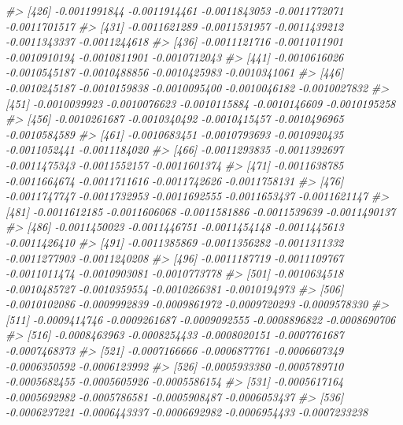\documentclass[
]{article}
\newenvironment{Shaded}{\begin{snugshade}}{\end{snugshade}}
\newcommand{\CommentTok}[1]{\textcolor[rgb]{0.56,0.35,0.01}{\textit{#1}}}
\begin{document}
\begin{Shaded}
\begin{Highlighting}[]
\CommentTok{\#\textgreater{} [426] {-}0.0011991844 {-}0.0011914461 {-}0.0011843053 {-}0.0011772071 {-}0.0011701517}
\CommentTok{\#\textgreater{} [431] {-}0.0011621289 {-}0.0011531957 {-}0.0011439212 {-}0.0011343337 {-}0.0011244618}
\CommentTok{\#\textgreater{} [436] {-}0.0011121716 {-}0.0011011901 {-}0.0010910194 {-}0.0010811901 {-}0.0010712043}
\CommentTok{\#\textgreater{} [441] {-}0.0010616026 {-}0.0010545187 {-}0.0010488856 {-}0.0010425983 {-}0.0010341061}
\CommentTok{\#\textgreater{} [446] {-}0.0010245187 {-}0.0010159838 {-}0.0010095400 {-}0.0010046182 {-}0.0010027832}
\CommentTok{\#\textgreater{} [451] {-}0.0010039923 {-}0.0010076623 {-}0.0010115884 {-}0.0010146609 {-}0.0010195258}
\CommentTok{\#\textgreater{} [456] {-}0.0010261687 {-}0.0010340492 {-}0.0010415457 {-}0.0010496965 {-}0.0010584589}
\CommentTok{\#\textgreater{} [461] {-}0.0010683451 {-}0.0010793693 {-}0.0010920435 {-}0.0011052441 {-}0.0011184020}
\CommentTok{\#\textgreater{} [466] {-}0.0011293835 {-}0.0011392697 {-}0.0011475343 {-}0.0011552157 {-}0.0011601374}
\CommentTok{\#\textgreater{} [471] {-}0.0011638785 {-}0.0011664674 {-}0.0011711616 {-}0.0011742626 {-}0.0011758131}
\CommentTok{\#\textgreater{} [476] {-}0.0011747747 {-}0.0011732953 {-}0.0011692555 {-}0.0011653437 {-}0.0011621147}
\CommentTok{\#\textgreater{} [481] {-}0.0011612185 {-}0.0011606068 {-}0.0011581886 {-}0.0011539639 {-}0.0011490137}
\CommentTok{\#\textgreater{} [486] {-}0.0011450023 {-}0.0011446751 {-}0.0011454148 {-}0.0011445613 {-}0.0011426410}
\CommentTok{\#\textgreater{} [491] {-}0.0011385869 {-}0.0011356282 {-}0.0011311332 {-}0.0011277903 {-}0.0011240208}
\CommentTok{\#\textgreater{} [496] {-}0.0011187719 {-}0.0011109767 {-}0.0011011474 {-}0.0010903081 {-}0.0010773778}
\CommentTok{\#\textgreater{} [501] {-}0.0010634518 {-}0.0010485727 {-}0.0010359554 {-}0.0010266381 {-}0.0010194973}
\CommentTok{\#\textgreater{} [506] {-}0.0010102086 {-}0.0009992839 {-}0.0009861972 {-}0.0009720293 {-}0.0009578330}
\CommentTok{\#\textgreater{} [511] {-}0.0009414746 {-}0.0009261687 {-}0.0009092555 {-}0.0008896822 {-}0.0008690706}
\CommentTok{\#\textgreater{} [516] {-}0.0008463963 {-}0.0008254433 {-}0.0008020151 {-}0.0007761687 {-}0.0007468373}
\CommentTok{\#\textgreater{} [521] {-}0.0007166666 {-}0.0006877761 {-}0.0006607349 {-}0.0006350592 {-}0.0006123992}
\CommentTok{\#\textgreater{} [526] {-}0.0005933380 {-}0.0005789710 {-}0.0005682455 {-}0.0005605926 {-}0.0005586154}
\CommentTok{\#\textgreater{} [531] {-}0.0005617164 {-}0.0005692982 {-}0.0005786581 {-}0.0005908487 {-}0.0006053437}
\CommentTok{\#\textgreater{} [536] {-}0.0006237221 {-}0.0006443337 {-}0.0006692982 {-}0.0006954433 {-}0.0007233238}

\end{Highlighting}
\end{Shaded}
\end{document}
